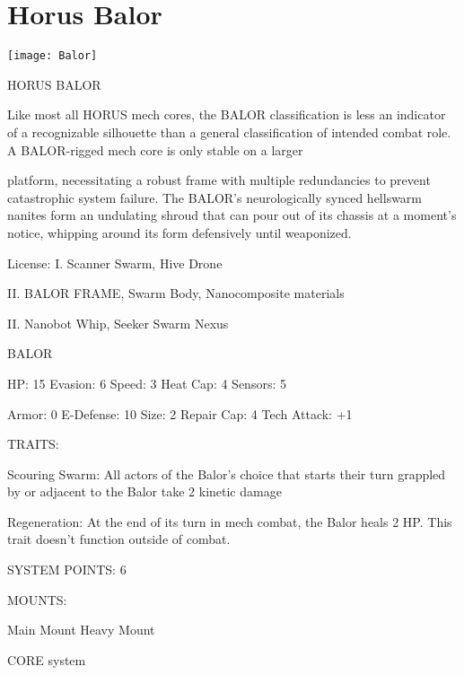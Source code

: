 \section{Horus Balor}

\texttt{[image: Balor]}

                                           HORUS BALOR

Like most all HORUS mech cores, the BALOR classification is less an indicator of a recognizable silhouette
than a general classification of intended combat role. A BALOR-rigged mech core is only stable on a larger

platform, necessitating a robust frame with multiple redundancies to prevent catastrophic system failure.
The BALOR’s neurologically synced hellswarm nanites form an undulating shroud that can pour out of its
chassis at a moment’s notice, whipping around its form defensively until weaponized.

                                                  License:
I. Scanner Swarm, Hive Drone

II. BALOR FRAME, Swarm Body, Nanocomposite materials

II. Nanobot Whip, Seeker Swarm Nexus


                                                 BALOR

 HP: 15         Evasion: 6                           Speed: 3           Heat Cap: 4       Sensors: 5

 Armor: 0       E-Defense: 10                        Size: 2            Repair Cap: 4     Tech Attack:
                                                                                          +1

                                                  TRAITS:

 Scouring Swarm: All actors of the Balor’s choice that starts their turn grappled by or adjacent to the
 Balor take 2 kinetic damage

 Regeneration: At the end of its turn in mech combat, the Balor heals 2 HP. This trait doesn’t function
 outside of combat.

                                            SYSTEM POINTS: 6

                                                 MOUNTS:

 Main Mount                                          Heavy Mount

                                               CORE system




